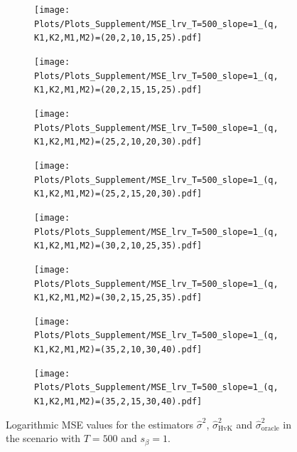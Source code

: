 \begin{figure}[p]
\begin{subfigure}[b]{0.45\textwidth}
\texttt{[image: Plots/Plots\_Supplement/MSE\_lrv\_T=500\_slope=1\_(q,K1,K2,M1,M2)=(20,2,10,15,25).pdf]}
\end{subfigure}
\hspace{0.25cm}
\begin{subfigure}[b]{0.45\textwidth}
\texttt{[image: Plots/Plots\_Supplement/MSE\_lrv\_T=500\_slope=1\_(q,K1,K2,M1,M2)=(20,2,15,15,25).pdf]}
\end{subfigure}

\begin{subfigure}[b]{0.45\textwidth}
\texttt{[image: Plots/Plots\_Supplement/MSE\_lrv\_T=500\_slope=1\_(q,K1,K2,M1,M2)=(25,2,10,20,30).pdf]}
\end{subfigure}
\hspace{0.25cm}
\begin{subfigure}[b]{0.45\textwidth}
\texttt{[image: Plots/Plots\_Supplement/MSE\_lrv\_T=500\_slope=1\_(q,K1,K2,M1,M2)=(25,2,15,20,30).pdf]}
\end{subfigure}

\begin{subfigure}[b]{0.45\textwidth}
\texttt{[image: Plots/Plots\_Supplement/MSE\_lrv\_T=500\_slope=1\_(q,K1,K2,M1,M2)=(30,2,10,25,35).pdf]}
\end{subfigure}
\hspace{0.25cm}
\begin{subfigure}[b]{0.45\textwidth}
\texttt{[image: Plots/Plots\_Supplement/MSE\_lrv\_T=500\_slope=1\_(q,K1,K2,M1,M2)=(30,2,15,25,35).pdf]}
\end{subfigure}

\begin{subfigure}[b]{0.45\textwidth}
\texttt{[image: Plots/Plots\_Supplement/MSE\_lrv\_T=500\_slope=1\_(q,K1,K2,M1,M2)=(35,2,10,30,40).pdf]}
\end{subfigure}
\hspace{0.25cm}
\begin{subfigure}[b]{0.45\textwidth}
\texttt{[image: Plots/Plots\_Supplement/MSE\_lrv\_T=500\_slope=1\_(q,K1,K2,M1,M2)=(35,2,15,30,40).pdf]}
\end{subfigure}
\caption{Logarithmic MSE values for the estimators $\widehat{\sigma}^2$, $\widehat{\sigma}^2_{\text{HvK}}$ and $\widehat{\sigma}^2_{\text{oracle}}$ in the scenario with $T=500$ and $s_\beta=1$.}\label{fig:MSE_slope1_lrv_robust}
\end{figure}



